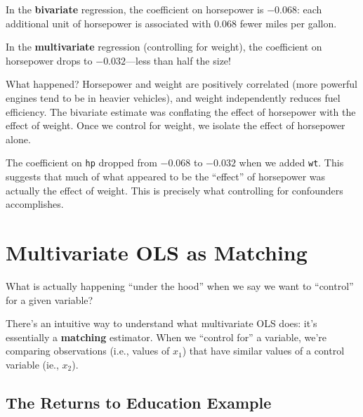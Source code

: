 \documentclass[
  letterpaper,
  DIV=11,
  numbers=noendperiod]{scrreprt}
\begin{document}
In the \textbf{bivariate} regression, the coefficient on horsepower is
\(-0.068\): each additional unit of horsepower is associated with 0.068
fewer miles per gallon.

In the \textbf{multivariate} regression (controlling for weight), the
coefficient on horsepower drops to \(-0.032\)---less than half the size!

What happened? Horsepower and weight are positively correlated (more
powerful engines tend to be in heavier vehicles), and weight
independently reduces fuel efficiency. The bivariate estimate was
conflating the effect of horsepower with the effect of weight. Once we
control for weight, we isolate the effect of horsepower alone.

\begin{tcolorbox}[enhanced jigsaw, arc=.35mm, bottomrule=.15mm, bottomtitle=1mm, breakable, colback=white, colbacktitle=quarto-callout-tip-color!10!white, colframe=quarto-callout-tip-color-frame, coltitle=black, left=2mm, leftrule=.75mm, opacityback=0, opacitybacktitle=0.6, rightrule=.15mm, title=\textcolor{quarto-callout-tip-color}{\faLightbulb}\hspace{0.5em}{What Changed?}, titlerule=0mm, toprule=.15mm, toptitle=1mm]

The coefficient on \texttt{hp} dropped from \(-0.068\) to \(-0.032\)
when we added \texttt{wt}. This suggests that much of what appeared to
be the ``effect'' of horsepower was actually the effect of weight. This
is precisely what controlling for confounders accomplishes.

\end{tcolorbox}

\section{Multivariate OLS as
Matching}\label{multivariate-ols-as-matching}

What is actually happening ``under the hood'' when we say we want to
``control'' for a given variable?

There's an intuitive way to understand what multivariate OLS does: it's
essentially a \textbf{matching} estimator. When we ``control for'' a
variable, we're comparing observations (i.e., values of \(x_1\)) that
have similar values of a control variable (ie., \(x_2\)).

\subsection{The Returns to Education
Example}\label{the-returns-to-education-example}
\end{document}
